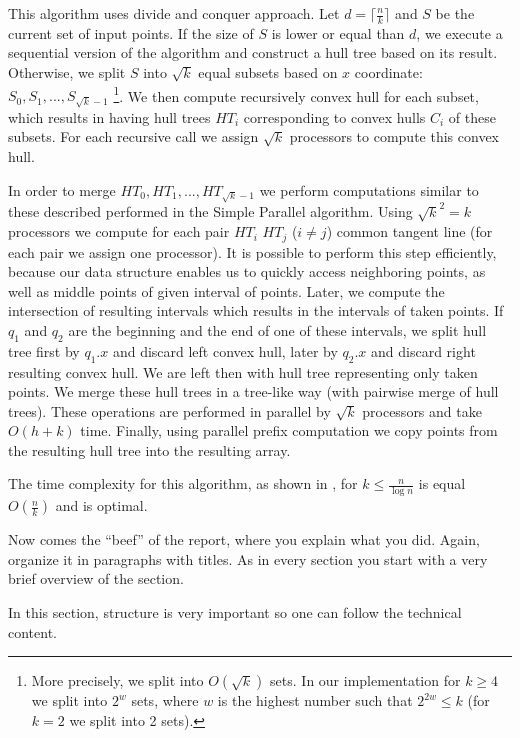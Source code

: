 \documentclass[letterpaper]{article}
\theoremstyle{definition}
\begin{document}
This algorithm uses divide and conquer approach. 
Let $d = \lceil\frac{n}{k}\rceil$ and $S$ be the current set of input points.
If the size of $S$ is lower or equal than $d$, we execute a sequential version of the algorithm and construct a hull tree based on its result.
Otherwise, we split $S$ into $\sqrt{k}$
equal subsets based on $x$ coordinate: $S_0, S_1, ..., S_{\sqrt{k} - 1}$
\footnote{More precisely, we split into $O(\sqrt k)$ sets. In our implementation for $k \geq 4$ we split into $2^w$ sets, where $w$ is the highest number such that $2^{2w} \leq k$ (for $k = 2$ we split into 2 sets).}.
We then compute recursively convex hull for each subset, which results in having hull trees $HT_i$ corresponding to convex hulls $C_i$ of these subsets.
For each recursive call we assign $\sqrt{k}$ processors to compute this convex hull.

In order to merge $HT_0, HT_1, ..., HT_{\sqrt{k} - 1}$ we perform computations similar to these described performed in the Simple Parallel algorithm.
Using $\sqrt{k}^2 = k$ processors we compute for each pair $HT_i$ $HT_j$ ($i \neq j$) common tangent line (for each pair we assign one processor).
It is possible to perform this step efficiently, because our data structure enables us to quickly access neighboring points, as well as middle points of given interval of points.
Later, we compute the intersection of resulting intervals which results in the intervals of taken points.
If $q_1$ and $q_2$ are the beginning and the end of one of these intervals, we split hull tree first by $q_1.x$ and discard left convex hull, later by $q_2.x$ and discard right resulting convex hull.
We are left then with hull tree representing only taken points.
We merge these hull trees in a tree-like way (with pairwise merge of hull trees).
These operations are performed in parallel by $\sqrt{k}$ processors and take $O(h + k)$ time.
Finally, using parallel prefix computation we copy points from the resulting hull tree into the resulting array.

The time complexity for this algorithm, as shown in \cite{HullTree}, for $k \leq \frac{n}{\log n}$ is equal $O(\frac{n}{k})$ and is optimal.

\iffalse
Now comes the ``beef'' of the report, where you explain what you
did. Again, organize it in paragraphs with titles. As in every section
you start with a very brief overview of the section.

In this section, structure is very important so one can follow the technical content.
\end{document}
